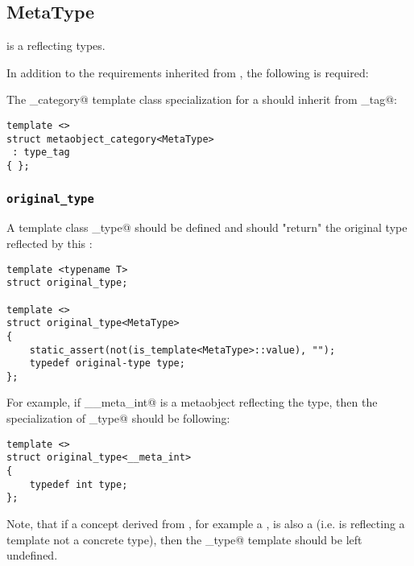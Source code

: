 \subsection{MetaType}
\label{concept-MetaType}


 is a  reflecting types.

In addition to the requirements inherited from , the following is required:

The \verb@metaobject_category@ template class specialization for a  should
inherit from \verb@type_tag@:

\begin{verbatim}
template <>
struct metaobject_category<MetaType>
 : type_tag
{ };
\end{verbatim}

\subsubsection{\texttt{original\_type}}

A template class \verb@original_type@ should be defined and should "return"
the original type reflected by this :

\begin{verbatim}
template <typename T>
struct original_type;

template <>
struct original_type<MetaType>
{
	static_assert(not(is_template<MetaType>::value), "");
	typedef original-type type;
};
\end{verbatim}

For example, if \verb@__meta_int@ is a metaobject reflecting the \verb@int@ type,
then the specialization of \verb@original_type@ should be following:

\begin{verbatim}
template <>
struct original_type<__meta_int>
{
	typedef int type;
};
\end{verbatim}

Note, that if a concept derived from , for example a ,
is also a  (i.e. is reflecting a template not a concrete type),
then the \verb@original_type@ template should be left undefined.


